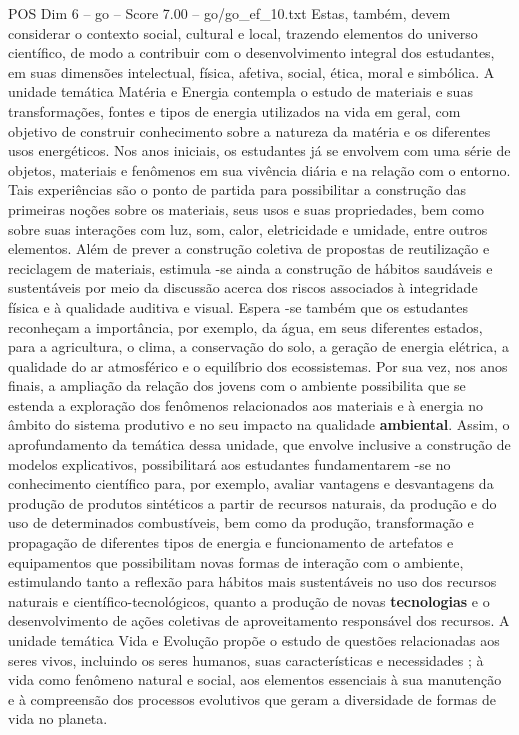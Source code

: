\begin{textsample}{POS Dim 6 – go – Score 7.00 – go/go\_ef\_10.txt}
Estas, também, devem considerar o contexto social, cultural e local, trazendo elementos do universo científico, de modo a contribuir com o desenvolvimento integral dos estudantes, em suas dimensões intelectual, física, afetiva, social, ética, moral e simbólica.
A unidade temática Matéria e Energia contempla o estudo de materiais e suas transformações, fontes e tipos de energia utilizados na vida em geral, com objetivo de construir conhecimento sobre a natureza da matéria e os diferentes usos energéticos.
Nos anos iniciais, os estudantes já se envolvem com uma série de objetos, materiais e fenômenos em sua vivência diária e na relação com o entorno.
Tais experiências são o ponto de partida para possibilitar a construção das primeiras noções sobre os materiais, seus usos e suas propriedades, bem como sobre suas interações com luz, som, calor, eletricidade e umidade, entre outros elementos.
Além de prever a construção coletiva de propostas de reutilização e reciclagem de materiais, estimula -se ainda a construção de hábitos saudáveis e sustentáveis por meio da discussão acerca dos riscos associados à integridade física e à qualidade auditiva e visual.
Espera -se também que os estudantes reconheçam a importância, por exemplo, da água, em seus diferentes estados, para a agricultura, o clima, a conservação do solo, a geração de energia elétrica, a qualidade do ar atmosférico e o equilíbrio dos ecossistemas.
Por sua vez, nos anos finais, a ampliação da relação dos jovens com o ambiente possibilita que se estenda a exploração dos fenômenos relacionados aos materiais e à energia no âmbito do sistema produtivo e no seu impacto na qualidade \textbf{ambiental}.
Assim, o aprofundamento da temática dessa unidade, que envolve inclusive a construção de modelos explicativos, possibilitará aos estudantes fundamentarem -se no conhecimento científico para, por exemplo, avaliar vantagens e desvantagens da produção de produtos sintéticos a partir de recursos naturais, da produção e do uso de determinados combustíveis, bem como da produção, transformação e propagação de diferentes tipos de energia e funcionamento de artefatos e equipamentos que possibilitam novas formas de interação com o ambiente, estimulando tanto a reflexão para hábitos mais sustentáveis no uso dos recursos naturais e científico-tecnológicos, quanto a produção de novas \textbf{tecnologias} e o desenvolvimento de ações coletivas de aproveitamento responsável dos recursos.
A unidade temática Vida e Evolução propõe o estudo de questões relacionadas aos seres vivos, incluindo os seres humanos, suas características e necessidades ; à vida como fenômeno natural e social, aos elementos essenciais à sua manutenção e à compreensão dos processos evolutivos que geram a diversidade de formas de vida no planeta.

\end{textsample}
